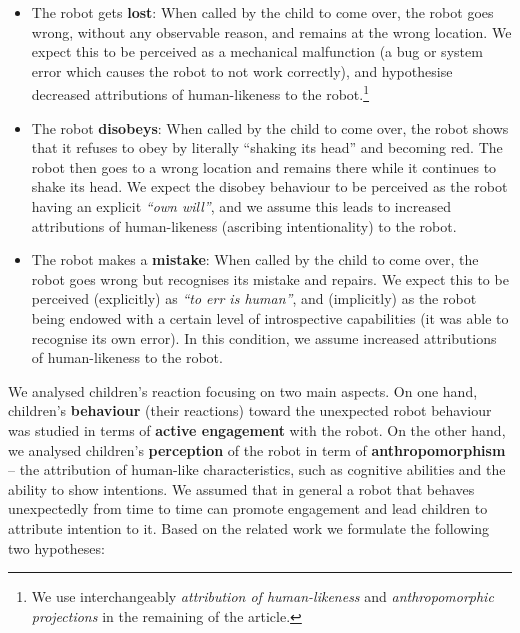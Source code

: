 \documentclass{sig-alternate}
\begin{document}
\begin{itemize}

    \item The robot gets \textbf{lost}: When called by the child to come over,
        the robot goes wrong, without any observable reason, and remains at the
        wrong location. We expect this to be perceived as a mechanical
        malfunction (a bug or system error which causes the robot to not work
        correctly), and hypothesise decreased attributions of human-likeness to
        the robot.\footnote{We use interchangeably \textit{attribution of
            human-likeness} and \textit{anthropomorphic projections} in the
        remaining of the article.} 

    \item The robot \textbf{disobeys}: When called by the child to come over, the
        robot shows that it refuses to obey by literally ``shaking its head'' and
        becoming red. The robot then goes to a wrong location and remains there
        while it continues to shake its head. We expect the disobey behaviour to
        be perceived as the robot having an explicit \textit{``own will''}, and
        we assume this leads to increased attributions of human-likeness
        (ascribing intentionality) to the robot.

    \item The robot makes a \textbf{mistake}: When called by the child to come
        over, the robot goes wrong but recognises its mistake and repairs. We
        expect this to be perceived (explicitly) as \textit{``to err is
        human''}, and (implicitly) as the robot being endowed with a certain
        level of introspective capabilities (it was able to recognise its own
        error). In this condition, we assume increased attributions of
        human-likeness to the robot.

\end{itemize}

We analysed children's reaction focusing on two main aspects. On one hand,
children's \textbf{behaviour} (their reactions) toward the unexpected robot
behaviour was studied in terms of \textbf{active engagement} with the robot. On
the other hand, we analysed children's \textbf{perception} of the robot in term
of \textbf{anthropomorphism} -- the attribution of human-like characteristics,
such as cognitive abilities and the ability to show intentions. We assumed that
in general a robot that behaves unexpectedly from time to time can promote
engagement and lead children to attribute intention to it. Based
on the related work we formulate the following two hypotheses:
\end{document}
